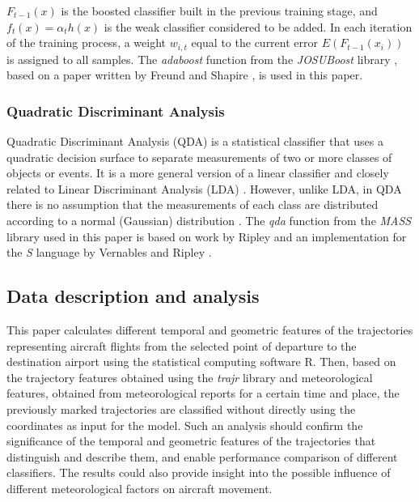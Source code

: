 \let\LaTeXcline\cline\documentclass[sn-mathphys-num]{sn-jnl}\let\cline\LaTeXcline
\begin{document}
$F_{t-1}(x)$ is the boosted classifier built in the previous training stage, and $f_{t}(x) = \alpha_{t} h(x)$ is the weak classifier considered to be added. In each iteration of the training process, a weight $w_{i,t}$ equal to the current error $E(F_{t-1}(x_{i}))$ is assigned to all samples. The \textit{adaboost} function from the \textit{JOSUBoost} library \cite{Olson2016}, based on a paper written by Freund and Shapire \cite{Freund1997}, is used in this paper.

\subsubsection{Quadratic Discriminant Analysis}
 
Quadratic Discriminant Analysis (QDA) is a statistical classifier that uses a quadratic decision surface to separate measurements of two or more classes of objects or events. It is a more general version of a linear classifier and closely related to Linear Discriminant Analysis (LDA) \cite{Tharwat2016}. However, unlike LDA, in QDA there is no assumption that the measurements of each class are distributed according to a normal (Gaussian) distribution \cite{Cover1965}. The \textit{qda} function from the \textit{MASS} library \cite{Ripley2009Mass} used in this paper is based on work by Ripley \cite{Ripley1996} and an implementation for the \textit{S} language by Vernables and Ripley \cite{Venables2002}.

\subsection{Data description and analysis}

This paper calculates different temporal and geometric features of the trajectories representing aircraft flights from the selected point of departure to the destination airport using the statistical computing software R. Then, based on the trajectory features obtained using the \textit{trajr} library and meteorological features, obtained from meteorological reports for a certain time and place, the previously marked trajectories are classified without directly using the coordinates as input for the model. Such an analysis should confirm the significance of the temporal and geometric features of the trajectories that distinguish and describe them, and enable performance comparison of different classifiers. The results could also provide insight into the possible influence of different meteorological factors on aircraft movement.
\end{document}
